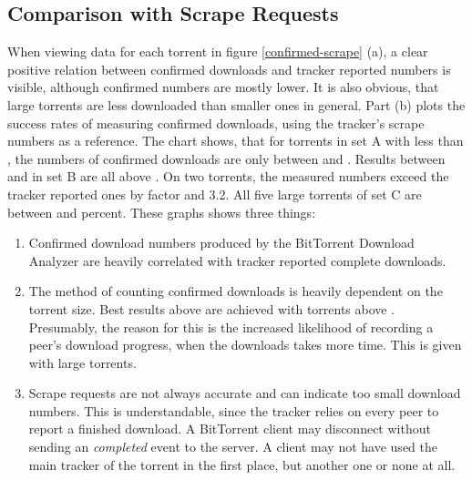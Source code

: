 \documentclass[10pt, a4paper, twoside=false, headsepline]{scrbook}
\renewcommand{\_}{\origunderscore\allowbreak}
\begin{document}
\subsection{Comparison with Scrape Requests}
When viewing data for each torrent in figure \ref{confirmed-scrape} (a), a clear positive relation between confirmed downloads and tracker reported numbers is visible, although confirmed numbers are mostly lower. It is also obvious, that large torrents are less downloaded than smaller ones in general. Part (b) plots the success rates of measuring confirmed downloads, using the tracker's scrape numbers as a reference. The chart shows, that for torrents in set A with less than , the numbers of confirmed downloads are only between  and . Results between  and  in set B are all above . On two torrents, the measured numbers exceed the tracker reported ones by factor  and {3.2}. All five large torrents of set C are between  and  percent. These graphs shows three things:
\begin{enumerate}
\item Confirmed download numbers produced by the BitTorrent Download Analyzer are heavily correlated with tracker reported complete downloads.
\item The method of counting confirmed downloads is heavily dependent on the torrent size. Best results above  are achieved with torrents above . Presumably, the reason for this is the increased likelihood of recording a peer's download progress, when the downloads takes more time. This is given with large torrents.
\item Scrape requests are not always accurate and can indicate too small download numbers. This is understandable, since the tracker relies on every peer to report a finished download. A BitTorrent client may disconnect without sending an \emph{completed} event to the server. A client may not have used the main tracker of the torrent in the first place, but another one or none at all.
\end{enumerate}
\end{document}

